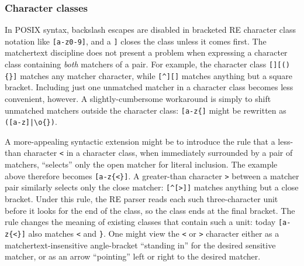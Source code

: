 \subsubsection{Character classes}
\label{app:regex:class}

In POSIX syntax, backslash escapes are disabled in
bracketed RE character class notation like \verb|[a-z0-9]|,
and a \verb|]| closes the class unless it comes first.
The matchertext discipline does not present a problem
when expressing a character class containing \emph{both} matchers of a pair.
For example,
the character class \verb|[][(){}]| matches any matcher character,
while \verb|[^][]| matches anything but a square bracket.
Including just one unmatched matcher in a character class
becomes less convenient, however.
A slightly-cumbersome workaround
is simply to shift unmatched matchers outside the character class:
\eg \verb|[a-z{]| might be rewritten as \verb=([a-z]|\o{})=.

A more-appealing syntactic extension might be to introduce the rule
that a less-than character \verb|<| in a character class,
when immediately surrounded by a pair of matchers,
``selects'' only the open matcher for literal inclusion.
The example above therefore becomes \verb|[a-z{<}]|.
A greater-than character \verb|>| between a matcher pair
similarly selects only the close matcher:
\verb|[^[>]]| matches anything but a close bracket.
Under this rule, the RE parser reads each such three-character unit
before it looks for the end of the class,
so the class ends at the final bracket.
The rule changes the meaning of existing classes that contain such a unit:
today \verb|[a-z{<}]| also matches \verb|<| and \verb|}|.
One might view the \verb|<| or \verb|>| character either
as a matchertext-insensitive angle-bracket
``standing in'' for the desired sensitive matcher,
or as an arrow ``pointing'' left or right to the desired matcher.




